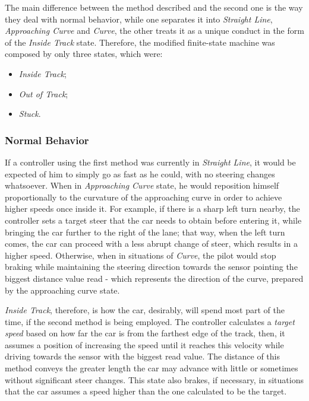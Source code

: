 	The main difference between the method described and the second one is the way they deal with normal behavior, while one separates it into \emph{Straight Line}, \emph{Approaching Curve} and \emph{Curve}, the other treats it as a unique conduct in the form of the \emph{Inside Track} state. Therefore, the modified finite-state machine was composed by only three states, which were:
	
	\begin{itemize}
		
		\item \emph{Inside Track};
		
		\item \emph{Out of Track};
		
		\item \emph{Stuck}.
		
	\end{itemize}
	
\subsubsection{Normal Behavior}
	
	If a controller using the first method was currently in \emph{Straight Line}, it would be expected of him to simply go as fast as he could, with no steering changes whatsoever. When in \emph{Approaching Curve} state, he would reposition himself proportionally to the curvature of the approaching curve in order to achieve higher speeds once inside it. For example, if there is a sharp left turn nearby, the controller sets a target steer that the car needs to obtain before entering it, while bringing the car further to the right of the lane; that way, when the left turn comes, the car can proceed with a less abrupt change of steer, which results in a higher speed. Otherwise, when in situations of \emph{Curve}, the pilot would stop braking while maintaining the steering direction towards the sensor pointing the biggest distance value read - which represents the direction of the curve, prepared by the approaching curve state.
	
	\emph{Inside Track}, therefore, is how the car, desirably, will spend most part of the time, if the second method is being employed. The controller calculates a \emph{target speed} based on how far the car is from the farthest edge of the track, then, it assumes a position of increasing the speed until it reaches this velocity while driving towards the sensor with the biggest read value. The distance of this method conveys the greater length the car may advance with little or sometimes without significant steer changes. This state also brakes, if necessary, in situations that the car assumes a speed higher than the one calculated to be the target.
	
